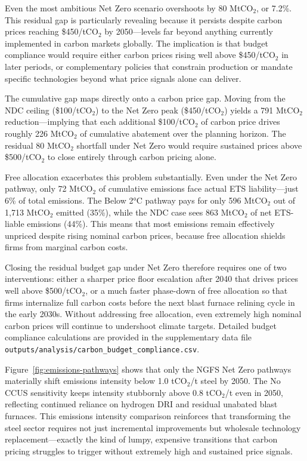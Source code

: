 Even the most ambitious Net Zero scenario overshoots by 80 MtCO$_2$, or 7.2\%. This residual gap is particularly revealing because it persists despite carbon prices reaching \$450/tCO$_2$ by 2050—levels far beyond anything currently implemented in carbon markets globally. The implication is that budget compliance would require either carbon prices rising well above \$450/tCO$_2$ in later periods, or complementary policies that constrain production or mandate specific technologies beyond what price signals alone can deliver.

The cumulative gap maps directly onto a carbon price gap. Moving from the NDC ceiling (\$100/tCO$_2$) to the Net Zero peak (\$450/tCO$_2$) yields a 791 MtCO$_2$ reduction—implying that each additional \$100/tCO$_2$ of carbon price drives roughly 226 MtCO$_2$ of cumulative abatement over the planning horizon. The residual 80 MtCO$_2$ shortfall under Net Zero would require sustained prices above \$500/tCO$_2$ to close entirely through carbon pricing alone.

Free allocation exacerbates this problem substantially. Even under the Net Zero pathway, only 72 MtCO$_2$ of cumulative emissions face actual ETS liability—just 6\% of total emissions. The Below 2°C pathway pays for only 596 MtCO$_2$ out of 1,713 MtCO$_2$ emitted (35\%), while the NDC case sees 863 MtCO$_2$ of net ETS-liable emissions (44\%). This means that most emissions remain effectively unpriced despite rising nominal carbon prices, because free allocation shields firms from marginal carbon costs.

Closing the residual budget gap under Net Zero therefore requires one of two interventions: either a sharper price floor escalation after 2040 that drives prices well above \$500/tCO$_2$, or a much faster phase-down of free allocation so that firms internalize full carbon costs before the next blast furnace relining cycle in the early 2030s. Without addressing free allocation, even extremely high nominal carbon prices will continue to undershoot climate targets. Detailed budget compliance calculations are provided in the supplementary data file \texttt{outputs/analysis/carbon\_budget\_compliance.csv}.

Figure~\ref{fig:emissions-pathways} shows that only the NGFS Net Zero pathways materially shift emissions intensity below 1.0 tCO$_2$/t steel by 2050. The No CCUS sensitivity keeps intensity stubbornly above 0.8 tCO$_2$/t even in 2050, reflecting continued reliance on hydrogen DRI and residual unabated blast furnaces. This emissions intensity comparison reinforces that transforming the steel sector requires not just incremental improvements but wholesale technology replacement—exactly the kind of lumpy, expensive transitions that carbon pricing struggles to trigger without extremely high and sustained price signals.


